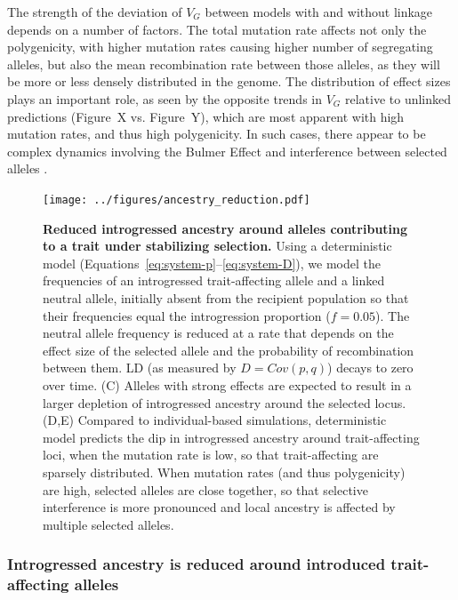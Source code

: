 \documentclass{article}
\begin{document}
The strength of the deviation of $V_G$ between models with and without linkage
depends on a number of factors. The total mutation rate affects not only the
polygenicity, with higher mutation rates causing higher number of segregating
alleles, but also the mean recombination rate between those alleles, as they
will be more or less densely distributed in the genome. The distribution of
effect sizes plays an important role, as seen by the opposite trends in $V_G$
relative to unlinked predictions (Figure~X vs. Figure~Y), which are most
apparent with high mutation rates, and thus high polygenicity. In such cases,
there appear to be complex dynamics involving the Bulmer Effect
\citep{bulmer1971effect} and interference between selected alleles
\citep{hill1966effect}.

\begin{figure}[t!]
    \centering
    \texttt{[image: ../figures/ancestry\_reduction.pdf]}
    \caption{
        \textbf{Reduced introgressed ancestry around alleles contributing to a
        trait under stabilizing selection.}
        Using a deterministic model
        (Equations~\ref{eq:system-p}--\ref{eq:system-D}), we model the
        frequencies of an introgressed trait-affecting allele and a linked
        neutral allele, initially absent from the recipient population so that
        their frequencies equal the introgression proportion ($f=0.05$).
        The neutral allele frequency is reduced at a rate that depends on
        the effect size of the selected allele and the probability of
        recombination between them. LD (as measured by $D=Cov(p,q)$) decays
        to zero over time.
        (C) Alleles with strong effects are expected to result in a larger
        depletion of introgressed ancestry around the selected locus.
        (D,E) Compared to individual-based simulations, deterministic model
        predicts the dip in introgressed ancestry around trait-affecting loci,
        when the mutation rate is low, so that trait-affecting are sparsely
        distributed. When mutation rates (and thus polygenicity) are high,
        selected alleles are close together, so that selective interference
        is more pronounced and local ancestry is affected by multiple selected
        alleles.
    }
    \label{fig:linkage}
\end{figure}

\subsubsection*{Introgressed ancestry is reduced around introduced
trait-affecting alleles}
\end{document}
